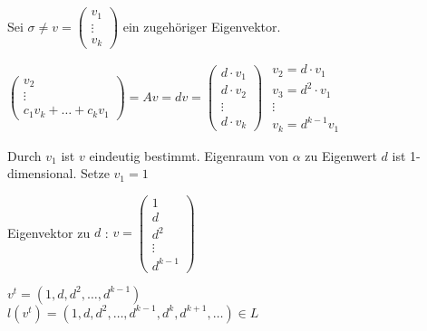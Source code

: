 Sei $\sigma \neq v = \begin{pmatrix}
v_1 \\ \vdots \\ v_k
\end{pmatrix}$ ein zugehöriger Eigenvektor. 

$\begin{pmatrix}
v_2 \\ \vdots \\ c_1v_k + \dots + c_kv_1
\end{pmatrix}
= Av
= dv
= \begin{pmatrix}
d \cdot v_1 \\ d \cdot v_2 \\ \vdots \\ d \cdot v_k
\end{pmatrix}
$\qquad
$\begin{array}{l}
v_2 = d \cdot v_1 \\
v_3 = d^2 \cdot v_1 \\
\vdots \\
v_k = d^{k-1}v_1
\end{array}$

Durch $v_1$ ist $v$ eindeutig bestimmt. Eigenraum von $\alpha$ zu Eigenwert $d$ ist 1-dimensional. Setze $v_1 = 1$

Eigenvektor zu $d$ : $v = \begin{pmatrix}
1 \\ d \\ d^2 \\ \vdots \\ d^{k-1}
\end{pmatrix}$

$v^t = (1, d, d^2, \dots, d^{k-1})$
\\$l(v^t) = (1, d, d^2, \dots, d^{k-1}, d^k, d^{k+1}, \dots) \in L$

